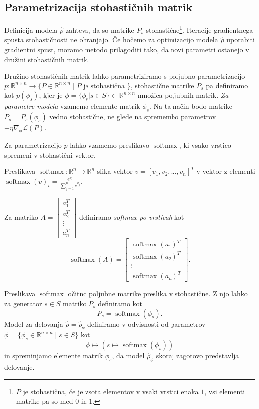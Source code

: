 \documentclass[mat2, tisk]{fmfdelo}
\newcommand{\R}{\mathbb R}
\newcommand{\loss }{\mathcal L}
\begin{document}
\subsection{Parametrizacija stohastičnih matrik}
\label{section:parametrizacija stohastičnih matrik}
Definicija modela $\hat  \rho$ zahteva, da so matrike  $P_s$ stohastične\footnote{$P$ je stohastična, če je vsota elementov v vsaki vrstici enaka $1$, vsi elementi matrike pa so med $0$ in $1$.}. Iteracije gradientnega spusta stohastičnosti ne ohranjajo. Če hočemo za optimizacijo modela $\hat \rho$ uporabiti gradientni spust, moramo metodo prilagoditi tako, da novi parametri ostanejo v družini stohastičnih matrik. 

Družino stohastičnih matrik lahko parametriziramo s poljubno parametrizacijo $p \colon \R^{n \times n} \to \{P \in \R^{n \times n} \mid P \text{ je stohastična }\}$, stohastične matrike $P_s$ pa definiramo kot $p(\phi_s)$, kjer je $\phi = \{\phi_s | s\in S \} \subset \R^{n \times n}$ množica poljubnih matrik. \emph{Za parametre modela} vzamemo elemente matrik $\phi_s$. Na ta način bodo matrike $P_s = P_s(\phi_s)$ vedno stohastične, ne glede na spremembo parametrov $-\eta \nabla_\phi \loss(P)$.

Za parametrizacijo $p$ lahko vzamemo preslikavo $\operatorname{softmax}$, ki vsako vrstico spremeni v stohastični vektor.
\begin{definicija}
     Preslikava $\operatorname{softmax} \colon \R^n \to \R^n$ slika vektor $v = [v_1, v_2, \dotsc, v_n]^T$ v vektor z elementi $\operatorname{softmax}(v)_i = \frac{e^{v_i}}{\sum_{j = 1}^n e^{v_j}}$.

     Za matriko $A = \begin{bmatrix}
         a_1^T \\ 
         a_2^T \\ 
         \vdots \\ 
         a_n^T
     \end{bmatrix}$ definiramo \emph{softmax po vrsticah} kot 
     $$\operatorname{softmax}(A) = \begin{bmatrix}
         \operatorname{softmax}(a_1)^T \\ 
         \operatorname{softmax}(a_2)^T \\ 
         \vdots \\ 
         \operatorname{softmax}(a_n)^T
     \end{bmatrix}.$$
\end{definicija}
Preslikava $\operatorname{softmax}$ očitno poljubne matrike preslika v stohastične. Z njo lahko za generator $s \in S$ matriko $P_s$ definiramo kot 
$$
P_s = \operatorname{softmax}(\phi_s).
$$
Model za delovanja $\hat \rho = \hat \rho_\phi$ definiramo v odvisnosti od parametrov $\phi = \{\phi_s \in \R^{n \times n } \mid s \in S\}$ kot 
$$
\phi \mapsto ( s \mapsto \operatorname{softmax}(\phi_s))
$$
in spreminjamo elemente matrik $ \phi_s$, da model $\hat \rho_\phi$ skoraj zagotovo predstavlja delovanje. 
\end{document}
